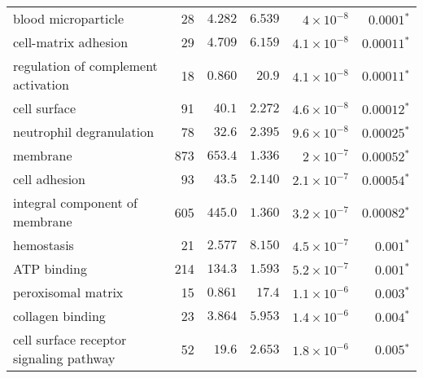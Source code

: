 \begin{longtable}{|l|r|r|r|r|r|}
                               blood microparticle &                      28 &                $ 4.282$ &   $ 6.539$ &   $ 4\times 10^{-8}$ &             $\bm{0.0001{^*}}$ \\
                              cell-matrix adhesion &                      29 &                $ 4.709$ &   $ 6.159$ &  $4.1\times 10^{-8}$ &            $\bm{0.00011{^*}}$ \\
               regulation of complement activation &                      18 &                $ 0.860$ &   $  20.9$ &  $4.1\times 10^{-8}$ &            $\bm{0.00011{^*}}$ \\
                                      cell surface &                      91 &                $  40.1$ &   $ 2.272$ &  $4.6\times 10^{-8}$ &            $\bm{0.00012{^*}}$ \\
                          neutrophil degranulation &                      78 &                $  32.6$ &   $ 2.395$ &  $9.6\times 10^{-8}$ &            $\bm{0.00025{^*}}$ \\
                                          membrane &                     873 &                $ 653.4$ &   $ 1.336$ &   $ 2\times 10^{-7}$ &            $\bm{0.00052{^*}}$ \\
                                     cell adhesion &                      93 &                $  43.5$ &   $ 2.140$ &  $2.1\times 10^{-7}$ &            $\bm{0.00054{^*}}$ \\
                    integral component of membrane &                     605 &                $ 445.0$ &   $ 1.360$ &  $3.2\times 10^{-7}$ &            $\bm{0.00082{^*}}$ \\
                                        hemostasis &                      21 &                $ 2.577$ &   $ 8.150$ &  $4.5\times 10^{-7}$ &             $\bm{ 0.001{^*}}$ \\
                                       ATP binding &                     214 &                $ 134.3$ &   $ 1.593$ &  $5.2\times 10^{-7}$ &             $\bm{ 0.001{^*}}$ \\
                                peroxisomal matrix &                      15 &                $ 0.861$ &   $  17.4$ &  $1.1\times 10^{-6}$ &             $\bm{ 0.003{^*}}$ \\
                                  collagen binding &                      23 &                $ 3.864$ &   $ 5.953$ &  $1.4\times 10^{-6}$ &             $\bm{ 0.004{^*}}$ \\
           cell surface receptor signaling pathway &                      52 &                $  19.6$ &   $ 2.653$ &  $1.8\times 10^{-6}$ &             $\bm{ 0.005{^*}}$ \\

\end{longtable}
